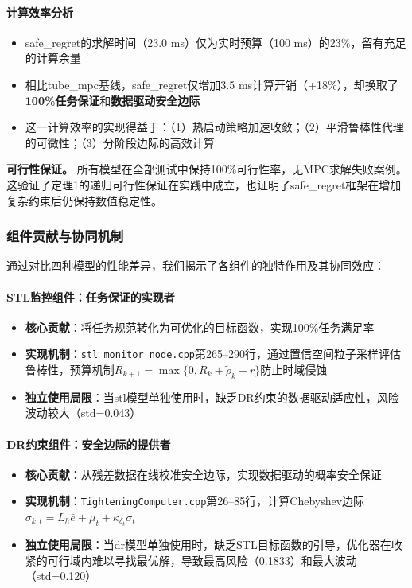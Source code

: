 \documentclass[12pt,a4paper]{ctexart}
\numberwithin{equation}{section}
\begin{document}
\paragraph*{计算效率分析}
\begin{itemize}
    \item safe\_regret的求解时间（23.0 ms）仅为实时预算（100 ms）的23\%，留有充足的计算余量
    \item 相比tube\_mpc基线，safe\_regret仅增加3.5 ms计算开销（+18\%），却换取了\textbf{100\%任务保证}和\textbf{数据驱动安全边际}
    \item 这一计算效率的实现得益于：（1）热启动策略加速收敛；（2）平滑鲁棒性代理的可微性；（3）分阶段边际的高效计算
\end{itemize}

\textbf{可行性保证。} 所有模型在全部测试中保持100\%可行性率，无MPC求解失败案例。这验证了定理1的递归可行性保证在实践中成立，也证明了safe\_regret框架在增加复杂约束后仍保持数值稳定性。

\subsubsection{组件贡献与协同机制}

通过对比四种模型的性能差异，我们揭示了各组件的独特作用及其协同效应：

\paragraph*{STL监控组件：任务保证的实现者}
\begin{itemize}
    \item \textbf{核心贡献}：将任务规范转化为可优化的目标函数，实现100\%任务满足率
    \item \textbf{实现机制}：\texttt{stl\_monitor\_node.cpp}第265--290行，通过置信空间粒子采样评估鲁棒性，预算机制$R_{k+1} = \max\{0, R_k + \widetilde{\rho}_k - \underline{r}\}$防止时域侵蚀
    \item \textbf{独立使用局限}：当stl模型单独使用时，缺乏DR约束的数据驱动适应性，风险波动较大（std=0.043）
\end{itemize}

\paragraph*{DR约束组件：安全边际的提供者}
\begin{itemize}
    \item \textbf{核心贡献}：从残差数据在线校准安全边际，实现数据驱动的概率安全保证
    \item \textbf{实现机制}：\texttt{TighteningComputer.cpp}第26--85行，计算Chebyshev边际$\sigma_{k,t} = L_h\bar{e} + \mu_t + \kappa_{\delta_t}\sigma_t$
    \item \textbf{独立使用局限}：当dr模型单独使用时，缺乏STL目标函数的引导，优化器在收紧的可行域内难以寻找最优解，导致最高风险（0.1833）和最大波动（std=0.120）
\end{itemize}
\end{document}
